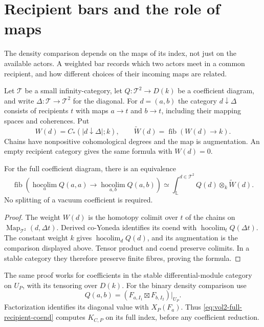 \section{Recipient bars and the role of maps}
\label{sec:vol2-recipient-bars}

The density comparison depends on the maps of its index,
not just on the available actors. A weighted bar records
which two actors meet in a common recipient, and how
different choices of their incoming maps are related.

Let $\mathcal T$ be a small infinity-category, let
$Q:\mathcal T^2\to D(k)$ be a coefficient diagram, and
write $\Delta:\mathcal T\to\mathcal T^2$ for the diagonal.
For $d=(a,b)$ the category $d\downarrow\Delta$ consists
of recipients $t$ with maps $a\to t$ and $b\to t$,
including their mapping spaces and coherences. Put
\[
 W(d)=C_*(|d\downarrow\Delta|;k),\qquad
 \widetilde W(d)=\operatorname{fib}(W(d)\to k).
\]
Chains have nonpositive cohomological degrees and the map
is augmentation. An empty recipient category gives the
same formula with $W(d)=0$.

\begin{proposition}\label{prop:vol2-full-recipient-coend}
For the full coefficient diagram, there is an equivalence
\begin{equation}\label{eq:vol2-full-recipient-coend}
 \operatorname{fib}\left(
   \operatorname*{hocolim}_aQ(a,a)
       \longrightarrow\operatorname*{hocolim}_{a,b}Q(a,b)
                  \right)
 \simeq\int^{d\in\mathcal T^2}_{\mathbb L}
                   Q(d)\otimes_k\widetilde W(d).
\end{equation}
No splitting of a vacuum coefficient is required.
\end{proposition}
\begin{proof}
The weight $W(d)$ is the homotopy colimit over $t$ of
the chains on $\operatorname{Map}_{\mathcal T^2}(d,\Delta t)$.
Derived co-Yoneda identifies its coend with
$\operatorname*{hocolim}_tQ(\Delta t)$.
The constant weight $k$ gives
$\operatorname*{hocolim}_dQ(d)$, and its augmentation is
the comparison displayed above. Tensor product and coend
preserve colimits. In a stable category they therefore
preserve finite fibres, proving the formula.
\end{proof}

The same proof works for coefficients in the stable
differential-module category on $U_P$, with its tensoring
over $D(k)$. For the binary density comparison use
\[
 Q(a,b)=(F_{a,I_1}\boxtimes F_{b,I_2})|_{U_P}.
\]
Factorization identifies its diagonal value with $X_P(F_a)$.
Thus \eqref{eq:vol2-full-recipient-coend} computes $K_{C,P}$
on its full index, before any coefficient reduction.

